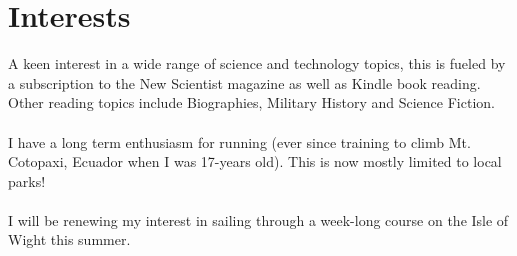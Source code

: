 
\section{Interests}

A keen interest in a wide range of science and technology topics, 
this is fueled by a subscription to the New Scientist magazine as 
well as Kindle book reading. Other reading topics include 
Biographies, Military History and Science Fiction. \\~\\
I have a long term enthusiasm for running (ever since training 
to climb Mt. Cotopaxi, Ecuador when I was 17-years old). 
This is now mostly limited to local parks! \\~\\
I will be renewing my interest in sailing through a week-long 
course on the Isle of Wight this summer.

\closesection{}
